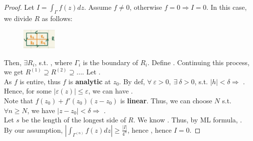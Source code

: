 \documentclass[12pt,a4paper]{article}
\begin{document}
\begin{proof}
  Let $I = \int_\Gamma f(z) dz$. Assume $f \neq 0$, otherwise $f = 0 \Rightarrow I = 0$. In this case, we divide $R$ as follows:

  \begin{figure}[h]
    \centering
    \includegraphics[width=0.15\textwidth]{img/divided_rect.png}
  \end{figure}

  \noindent Then, $\exists R_i$, s.t. , where $\Gamma_i$ is the boundary of $R_i$. Define . Continuing this process, we get $R^{(1)} \supseteq R^{(2)} \supseteq \dots$. Let . \\

  \noindent As $f$ is entire, thus $f$ is \textbf{analytic} at $z_0$. By def, $\forall\ \varepsilon > 0,\ \exists\ \delta > 0$, s.t. $|h| < \delta \Rightarrow$ . Hence, for some $|\varepsilon(z)| \leq \varepsilon$, we can have . \\

  \noindent Note that $f(z_0) + f'(z_0)(z - z_0)$ is \textbf{linear}. Thus, we can choose $N$ s.t. $\forall n \geq N$, we have $|z - z_0| < \delta \Rightarrow$ . \\

  \noindent Let $s$ be the length of the longest side of $R$. We know . Thus, by ML formula, . \\

  \noindent By our assumption, $|\int_{\Gamma^{(n)}} f(z) dz| \geq \frac{|I|}{4^n}$, hence , hence $I = 0$.
\end{proof}

\end{document}
